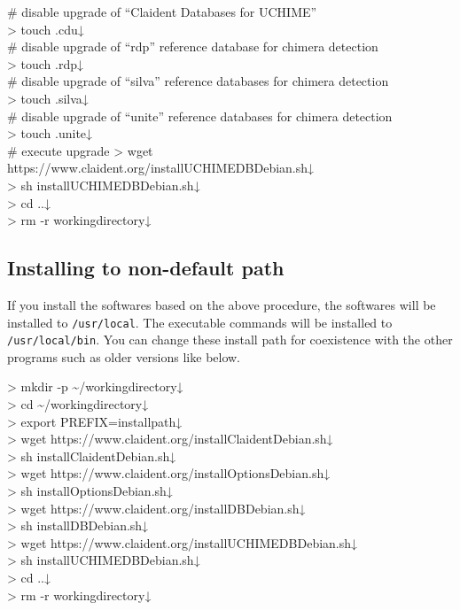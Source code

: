 \documentclass[titlepage,10pt,a4paper,english]{jsbook}
\newenvironment{cmd}{\begin{oframed}\raggedright\ttfamily\footnotesize\setlength{\baselineskip}{1.4em}}{\end{oframed}\vspace{-1em}}
\begin{document}
\begin{cmd}
\# disable upgrade of ``Claident Databases for UCHIME''\\
{\textgreater} touch .cdu↓\\
\# disable upgrade of ``rdp'' reference database for chimera detection\\
{\textgreater} touch .rdp↓\\
\# disable upgrade of ``silva'' reference databases for chimera detection\\
{\textgreater} touch .silva↓\\
\# disable upgrade of ``unite'' reference databases for chimera detection\\
{\textgreater} touch .unite↓\\
\# execute upgrade
{\textgreater} wget https://www.claident.org/installUCHIMEDB{\textunderscore}Debian.sh↓\\
{\textgreater} sh installUCHIMEDB{\textunderscore}Debian.sh↓\\
{\textgreater} cd ..↓\\
{\textgreater} rm -r workingdirectory↓
\end{cmd}

\subsection{Installing to non-default path}

If you install the softwares based on the above procedure, the softwares will be installed to \texttt{/usr/local}.
The executable commands will be installed to \texttt{/usr/local/bin}.
You can change these install path for coexistence with the other programs such as older versions like below.

\begin{cmd}
{\textgreater} mkdir -p {\textasciitilde}/workingdirectory↓\\
{\textgreater} cd {\textasciitilde}/workingdirectory↓\\
{\textgreater} export PREFIX=install{\textunderscore}path↓\\
{\textgreater} wget https://www.claident.org/installClaident{\textunderscore}Debian.sh↓\\
{\textgreater} sh installClaident{\textunderscore}Debian.sh↓\\
{\textgreater} wget https://www.claident.org/installOptions{\textunderscore}Debian.sh↓\\
{\textgreater} sh installOptions{\textunderscore}Debian.sh↓\\
{\textgreater} wget https://www.claident.org/installDB{\textunderscore}Debian.sh↓\\
{\textgreater} sh installDB{\textunderscore}Debian.sh↓\\
{\textgreater} wget https://www.claident.org/installUCHIMEDB{\textunderscore}Debian.sh↓\\
{\textgreater} sh installUCHIMEDB{\textunderscore}Debian.sh↓\\
{\textgreater} cd ..↓\\
{\textgreater} rm -r workingdirectory↓
\end{cmd}
\end{document}
